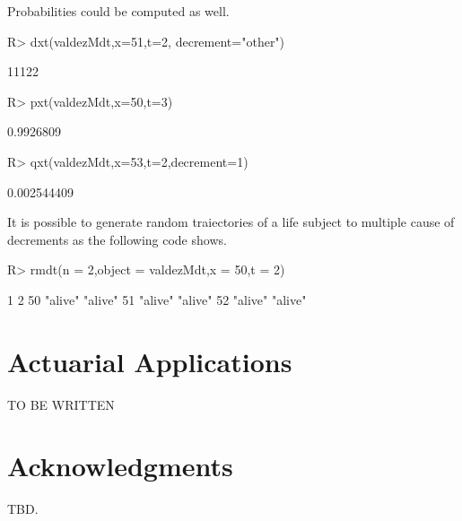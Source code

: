 \documentclass[nojss]{jss}
\begin{document}
Probabilities could be computed as well.

\begin{Schunk}
\begin{Sinput}
R> dxt(valdezMdt,x=51,t=2, decrement="other")
\end{Sinput}
\begin{Soutput}
[1] 11122
\end{Soutput}
\begin{Sinput}
R> pxt(valdezMdt,x=50,t=3)
\end{Sinput}
\begin{Soutput}
[1] 0.9926809
\end{Soutput}
\begin{Sinput}
R> qxt(valdezMdt,x=53,t=2,decrement=1)
\end{Sinput}
\begin{Soutput}
[1] 0.002544409
\end{Soutput}
\end{Schunk}

It is possible to generate random traiectories of a life subject to multiple cause of decrements as the following code shows.

\begin{Schunk}
\begin{Sinput}
R> rmdt(n = 2,object = valdezMdt,x = 50,t = 2)
\end{Sinput}
\begin{Soutput}
   1       2      
50 "alive" "alive"
51 "alive" "alive"
52 "alive" "alive"
\end{Soutput}
\end{Schunk}

\section{Actuarial Applications}

TO BE WRITTEN


\section*{Acknowledgments}\label{sec:acknowledgments}

TBD.



\end{document}

